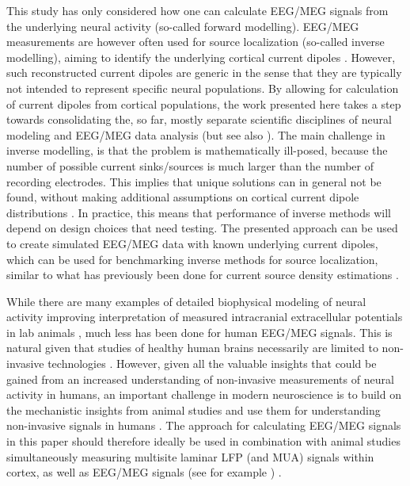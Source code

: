 \documentclass[preprint,10pt,authoryear]{elsarticle}
\newcommand{\newtxt}[1]{{\color{Red}#1}}
\begin{document}
\newtxt{This study has only considered how one can calculate EEG/MEG signals from the underlying neural activity (so-called forward modelling).} EEG/MEG measurements are \newtxt{however} often used for source localization \newtxt{(so-called inverse modelling)}, aiming to identify the underlying cortical current dipoles \citep{NUNEZ2006, Gramfort2014, Ilmoniemi2019}. However, such reconstructed current dipoles are generic in the sense that they are typically not intended to represent specific neural populations. By allowing for calculation of current dipoles from cortical populations, the work presented here takes a step towards consolidating the, so far, mostly separate scientific disciplines of neural modeling and EEG/MEG data analysis (but see also \cite{NEYMOTIN2020}). \newtxt{The main challenge in inverse modelling, is that the problem is mathematically ill-posed, because the number of possible current sinks/sources is much larger than the number of recording electrodes. This implies that unique solutions can in general not be found, without making additional assumptions on cortical current dipole distributions \citep{PETTERSEN2012}. In practice, this means that performance of inverse methods will depend on design choices that need testing. The presented approach can be used to create simulated EEG/MEG data with known underlying current dipoles, which can be used for benchmarking inverse methods for source localization, similar to what has previously been done for current source density estimations \citep{Pettersen2006}.}

While there are many examples of detailed biophysical modeling of neural activity improving interpretation of measured intracranial extracellular potentials in lab animals \citep{Einevoll2007, Blomquist2009, McColgan2017, Luo2018, Chatzikalymniou2018, Telenczuk2019}, much less has been done for human EEG/MEG signals. This is natural given that studies of healthy human brains necessarily are limited to non-invasive technologies \citep{SILVA2013, Uhlirova2016, COHEN2017}.
However, given all the valuable insights that could be gained from an increased understanding of non-invasive measurements of neural activity in humans, an important challenge in modern neuroscience is to build on the mechanistic insights from animal studies and use them for understanding non-invasive signals in humans \citep{SILVA2013, Uhlirova2016, COHEN2017, EINEVOLL2019, MAKI2019}.
The approach for calculating EEG/MEG signals in this paper should therefore ideally be used in combination with animal studies simultaneously measuring multisite laminar LFP (and MUA) signals within cortex, as well as EEG/MEG signals (see for example \cite{BRUYNS2017}) \citep{COHEN2017}.
\end{document}
